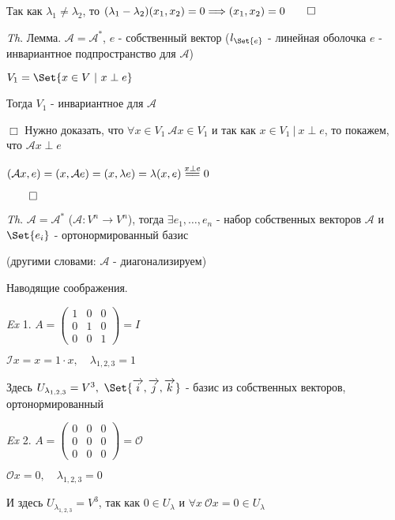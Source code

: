\documentclass[12pt]{article}
\begin{document}
    Так как $\lambda_1 \neq \lambda_2$, то $(\lambda_1 - \lambda_2) (x_1, x_2) = 0 \Longrightarrow (x_1, x_2) = 0 \qed$

    \vspace{3mm}
\textit{Th}. Лемма. $\mathcal{A} = \mathcal{A}^*$, $e$ - собственный вектор ($l_{\Set{e}}$ - линейная оболочка $e$ - инвариантное подпространство для $\mathcal{A}$)

    $V_1 = \Set{x \in V \ | \ x \perp e}$

    Тогда $V_1$ - инвариантное для $\mathcal{A}$

    $\Box$ Нужно доказать, что $\forall x \in V_1 \ \mathcal{A}x \in V_1$ и так как $x \in V_1 \ | \ x \perp e$, то
    покажем, что $\mathcal{A}x \perp e$

    $(\mathcal{A}x, e) = (x, \mathcal{A}e) = (x, \lambda e) = \lambda (x, e) \stackrel{x \perp e}{=\joinrel=} 0$

    $\qed$

    \vspace{3mm}
\textit{Th}. $\mathcal{A} = \mathcal{A}^*$ ($\mathcal{A} : V^n \to V^n$),
    тогда $\exists e_1, \dots, e_n$ - набор собственных векторов $\mathcal{A}$ и $\Set{e_i}$ - ортонормированный базис

    (другими словами: $\mathcal{A}$ - диагонализируем)

    Наводящие соображения.

    \vspace{3mm}
\textit{Ex} 1. $A = \begin{pmatrix}1 & 0 & 0 \\ 0 & 1 & 0 \\ 0 & 0 & 1\end{pmatrix} = I$

    $\mathcal{I}x = x = 1 \cdot x, \quad \lambda_{1,2,3} = 1$

    Здесь $U_{\lambda_{1,2,3}} = V^3, \ \Set{\overrightarrow{i}, \overrightarrow{j}, \overrightarrow{k}}$ - базис из собственных векторов, ортонормированный

    \vspace{3mm}
\textit{Ex} 2. $A = \begin{pmatrix}0 & 0 & 0 \\ 0 & 0 & 0 \\ 0 & 0 & 0\end{pmatrix} = \mathcal{O}$

    $\mathcal{O}x = 0, \quad \lambda_{1,2,3} = 0$

    И здесь $U_{\lambda_{1,2,3}} = V^3$, так как $0 \in U_\lambda$ и $\forall x \ \mathcal{O}x = 0 \in U_\lambda$
\end{document}
